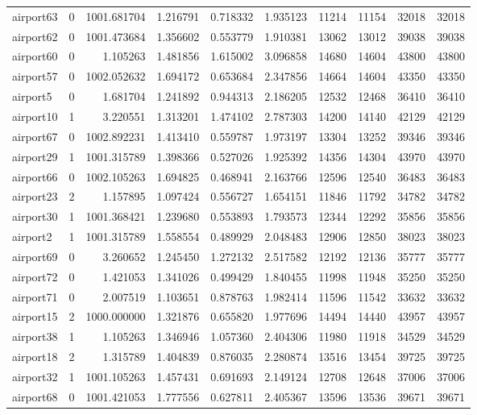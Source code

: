 \begin{longtable}{|l|r|r|r|r|r|r|r|r|r|}
airport63 & 0 & 1001.681704 & 1.216791 & 0.718332 & 1.935123 & 11214 & 11154 & 32018 & 32018 \\
airport62 & 0 & 1001.473684 & 1.356602 & 0.553779 & 1.910381 & 13062 & 13012 & 39038 & 39038 \\
airport60 & 0 & 1.105263 & 1.481856 & 1.615002 & 3.096858 & 14680 & 14604 & 43800 & 43800 \\
airport57 & 0 & 1002.052632 & 1.694172 & 0.653684 & 2.347856 & 14664 & 14604 & 43350 & 43350 \\
airport5 & 0 & 1.681704 & 1.241892 & 0.944313 & 2.186205 & 12532 & 12468 & 36410 & 36410 \\
airport10 & 1 & 3.220551 & 1.313201 & 1.474102 & 2.787303 & 14200 & 14140 & 42129 & 42129 \\
airport67 & 0 & 1002.892231 & 1.413410 & 0.559787 & 1.973197 & 13304 & 13252 & 39346 & 39346 \\
airport29 & 1 & 1001.315789 & 1.398366 & 0.527026 & 1.925392 & 14356 & 14304 & 43970 & 43970 \\
airport66 & 0 & 1002.105263 & 1.694825 & 0.468941 & 2.163766 & 12596 & 12540 & 36483 & 36483 \\
airport23 & 2 & 1.157895 & 1.097424 & 0.556727 & 1.654151 & 11846 & 11792 & 34782 & 34782 \\
airport30 & 1 & 1001.368421 & 1.239680 & 0.553893 & 1.793573 & 12344 & 12292 & 35856 & 35856 \\
airport2 & 1 & 1001.315789 & 1.558554 & 0.489929 & 2.048483 & 12906 & 12850 & 38023 & 38023 \\
airport69 & 0 & 3.260652 & 1.245450 & 1.272132 & 2.517582 & 12192 & 12136 & 35777 & 35777 \\
airport72 & 0 & 1.421053 & 1.341026 & 0.499429 & 1.840455 & 11998 & 11948 & 35250 & 35250 \\
airport71 & 0 & 2.007519 & 1.103651 & 0.878763 & 1.982414 & 11596 & 11542 & 33632 & 33632 \\
airport15 & 2 & 1000.000000 & 1.321876 & 0.655820 & 1.977696 & 14494 & 14440 & 43957 & 43957 \\
airport38 & 1 & 1.105263 & 1.346946 & 1.057360 & 2.404306 & 11980 & 11918 & 34529 & 34529 \\
airport18 & 2 & 1.315789 & 1.404839 & 0.876035 & 2.280874 & 13516 & 13454 & 39725 & 39725 \\
airport32 & 1 & 1001.105263 & 1.457431 & 0.691693 & 2.149124 & 12708 & 12648 & 37006 & 37006 \\
airport68 & 0 & 1001.421053 & 1.777556 & 0.627811 & 2.405367 & 13596 & 13536 & 39671 & 39671 \\

\end{longtable}
